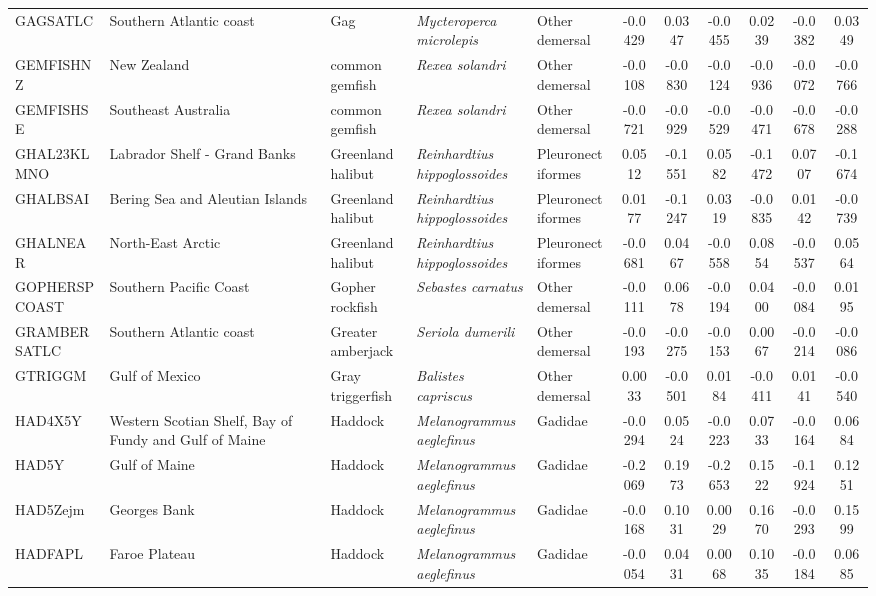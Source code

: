 \begin{longtable}{p{3cm}p{3cm}lllcccccc}
  GAGSATLC & Southern Atlantic coast & Gag & \textit{Mycteroperca microlepis} & Other demersal & -0.0429 & 0.0347 & -0.0455 & 0.0239 & -0.0382 & 0.0349 \\
  GEMFISHNZ & New Zealand & common gemfish & \textit{Rexea solandri} & Other demersal & -0.0108 & -0.0830 & -0.0124 & -0.0936 & -0.0072 & -0.0766 \\
  GEMFISHSE & Southeast Australia & common gemfish & \textit{Rexea solandri} & Other demersal & -0.0721 & -0.0929 & -0.0529 & -0.0471 & -0.0678 & -0.0288 \\
  GHAL23KLMNO & Labrador Shelf - Grand Banks & Greenland halibut & \textit{Reinhardtius hippoglossoides} & Pleuronectiformes & 0.0512 & -0.1551 & 0.0582 & -0.1472 & 0.0707 & -0.1674 \\
  GHALBSAI & Bering Sea and Aleutian Islands & Greenland halibut & \textit{Reinhardtius hippoglossoides} & Pleuronectiformes & 0.0177 & -0.1247 & 0.0319 & -0.0835 & 0.0142 & -0.0739 \\
  GHALNEAR & North-East Arctic & Greenland halibut & \textit{Reinhardtius hippoglossoides} & Pleuronectiformes & -0.0681 & 0.0467 & -0.0558 & 0.0854 & -0.0537 & 0.0564 \\
  GOPHERSPCOAST & Southern Pacific Coast & Gopher rockfish & \textit{Sebastes carnatus} & Other demersal & -0.0111 & 0.0678 & -0.0194 & 0.0400 & -0.0084 & 0.0195 \\
  GRAMBERSATLC & Southern Atlantic coast & Greater amberjack & \textit{Seriola dumerili} & Other demersal & -0.0193 & -0.0275 & -0.0153 & 0.0067 & -0.0214 & -0.0086 \\
  GTRIGGM & Gulf of Mexico & Gray triggerfish & \textit{Balistes capriscus} & Other demersal & 0.0033 & -0.0501 & 0.0184 & -0.0411 & 0.0141 & -0.0540 \\
  HAD4X5Y & Western Scotian Shelf, Bay of Fundy and Gulf of Maine & Haddock & \textit{Melanogrammus aeglefinus} & Gadidae & -0.0294 & 0.0524 & -0.0223 & 0.0733 & -0.0164 & 0.0684 \\
  HAD5Y & Gulf of Maine & Haddock & \textit{Melanogrammus aeglefinus} & Gadidae & -0.2069 & 0.1973 & -0.2653 & 0.1522 & -0.1924 & 0.1251 \\
  HAD5Zejm & Georges Bank & Haddock & \textit{Melanogrammus aeglefinus} & Gadidae & -0.0168 & 0.1031 & 0.0029 & 0.1670 & -0.0293 & 0.1599 \\
  HADFAPL & Faroe Plateau & Haddock & \textit{Melanogrammus aeglefinus} & Gadidae & -0.0054 & 0.0431 & 0.0068 & 0.1035 & -0.0184 & 0.0685 \\

\end{longtable}
